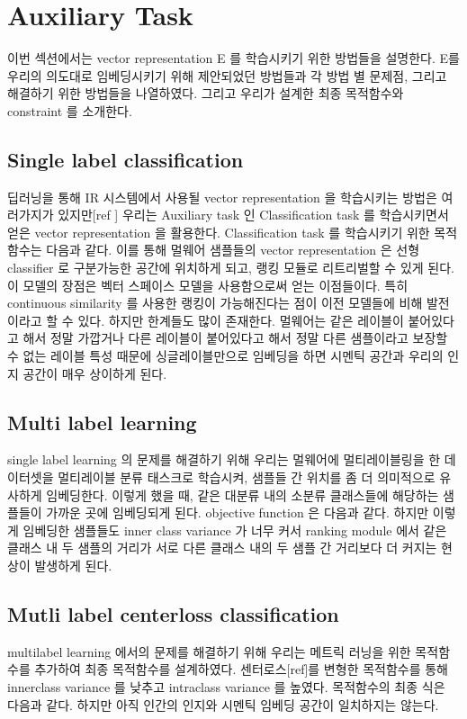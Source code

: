 \section{Auxiliary Task}
이번 섹션에서는 vector representation E 를 학습시키기 위한 방법들을 설명한다. E를 우리의 의도대로 임베딩시키기 위해 제안되었던 방법들과 각 방법 별 문제점, 그리고 해결하기 위한 방법들을 나열하였다. 그리고 우리가 설계한 최종 목적함수와 constraint 를 소개한다. 


\subsection{Single label classification}
 딥러닝을 통해 IR 시스템에서 사용될 vector representation 을 학습시키는 방법은 여러가지가 있지만[ref ] 우리는 Auxiliary task 인 Classification task 를 학습시키면서 얻은 vector representation 을 활용한다. Classification task 를 학습시키기 위한 목적함수는 다음과 같다. 이를 통해 멀웨어 샘플들의 vector representation 은 선형 classifier 로 구분가능한 공간에 위치하게 되고, 랭킹 모듈로 리트리벌할 수 있게 된다. 이 모델의 장점은 벡터 스페이스 모델을 사용함으로써 얻는 이점들이다. 특히 continuous similarity 를 사용한 랭킹이 가능해진다는 점이 이전 모델들에 비해 발전이라고 할 수 있다. 하지만 한계들도 많이 존재한다. 멀웨어는 같은 레이블이 붙어있다고 해서 정말 가깝거나 다른 레이블이 붙어있다고 해서 정말 다른 샘플이라고 보장할 수 없는 레이블 특성 때문에 싱글레이블만으로 임베딩을 하면 시멘틱 공간과 우리의 인지 공간이 매우 상이하게 된다. 



\subsection{Multi label learning}
single label learning 의 문제를 해결하기 위해 우리는 멀웨어에 멀티레이블링을 한 데이터셋을 멀티레이블 분류 태스크로 학습시켜, 샘플들 간 위치를 좀 더 의미적으로 유사하게 임베딩한다. 이렇게 했을 때, 같은 대분류 내의 소분류 클래스들에 해당하는 샘플들이 가까운 곳에 임베딩되게 된다. objective function 은 다음과 같다. 하지만 이렇게 임베딩한 샘플들도 inner class variance 가 너무 커서 ranking module 에서 같은 클래스 내 두 샘플의 거리가 서로 다른 클래스 내의 두 샘플 간 거리보다 더 커지는 현상이 발생하게 된다. 



\subsection{Mutli label centerloss classification}
multilabel learning 에서의 문제를 해결하기 위해 우리는 메트릭 러닝을 위한 목적함수를 추가하여 최종 목적함수를 설계하였다. 센터로스[ref]를 변형한 목적함수를 통해 innerclass variance 를 낮추고 intraclass variance 를 높였다. 목적함수의 최종 식은 다음과 같다. 하지만 아직 인간의 인지와 시멘틱 임베딩 공간이 일치하지는 않는다. 

